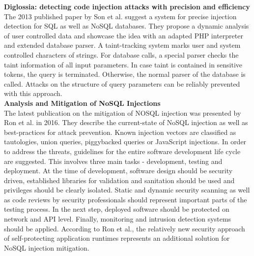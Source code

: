 \textbf{Diglossia: detecting code injection attacks with precision and efficiency} \cite{Son:2013} \\
The 2013 published paper by Son et al. suggest a system for precise injection detection for SQL as well as NoSQL databases. They propose a dynamic analysis of user controlled data and showcase the idea with an adapted PHP interpreter and extended database parser. A taint-tracking system marks user and system controlled characters of strings. For database calls, a special parser checks the taint information of all input parameters. In case taint is contained in sensitive tokens, the query is terminated. Otherwise, the normal parser of the database is called. Attacks on the structure of query parameters can be reliably prevented with this approach.\\

\textbf{Analysis and Mitigation of NoSQL Injections} \cite{Ron:2016} \\
The latest publication on the mitigation of NOSQL injection was presented by Ron et al. in 2016. They describe the current-state of NoSQL injection as well as best-practices for attack prevention. Known injection vectors are classified as tautologies, union queries, piggybacked queries or JavaScript injections. In order to address the threats, guidelines for the entire software development life cycle are suggested. This involves three main tasks - development, testing and deployment. At the time of development, software design should be security driven, established libraries for validation and sanitation should be used and privileges should be clearly isolated. Static and dynamic security scanning as well as code reviews by security professionals should represent important parts of the testing process. In the next step, deployed software should be protected on network and API level. Finally, monitoring and intrusion detection systems should be applied. According to Ron et al., the relatively new security approach of self-protecting application runtimes represents an additional solution for NoSQL injection mitigation.\\

